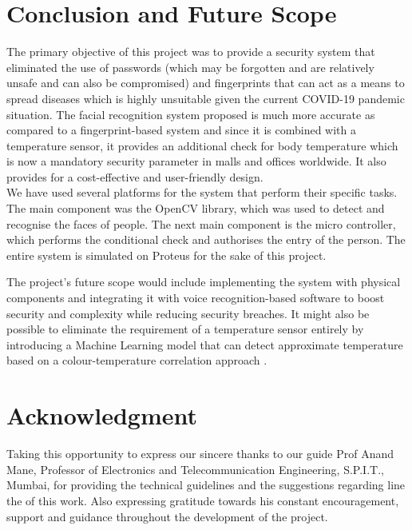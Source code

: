 \documentclass[conference]{IEEEtran}
\begin{document}
	\section{Conclusion and Future Scope}
	The primary objective of this project was to provide a security system that eliminated the use of passwords (which may be forgotten and are relatively unsafe and can also be compromised) and fingerprints that can act as a means to spread diseases which is highly unsuitable given the current COVID-19 pandemic situation. The facial recognition system proposed is much more accurate as compared to a fingerprint-based system and since it is combined with a temperature sensor, it provides an additional check for body temperature which is now a mandatory security parameter in malls and offices worldwide. It also provides for a cost-effective and user-friendly design.\\
	We have used several platforms for the system that perform their specific tasks. The main component was the OpenCV library, which was used to detect and recognise the faces of people. The next main component is the micro controller, which performs the conditional check and authorises the entry of the person. The entire system is simulated on Proteus for the sake of this project. 
	
	The project's future scope would include implementing the system with physical components and integrating it with voice recognition-based software to boost security and complexity while reducing security breaches\cite{15}. It might also be possible to eliminate the requirement of a temperature sensor entirely by introducing a Machine Learning model that can detect approximate temperature based on a colour-temperature correlation approach \cite{16}.
	
	\section*{Acknowledgment}
	Taking this opportunity to express our sincere
	thanks to our guide Prof Anand Mane,
	Professor of Electronics and Telecommunication
	Engineering, S.P.I.T., Mumbai, for providing the
	technical guidelines and the suggestions regarding line the
	of this work. Also expressing gratitude
	towards his constant encouragement, support and
	guidance throughout the development of the project.
	
\end{document}
